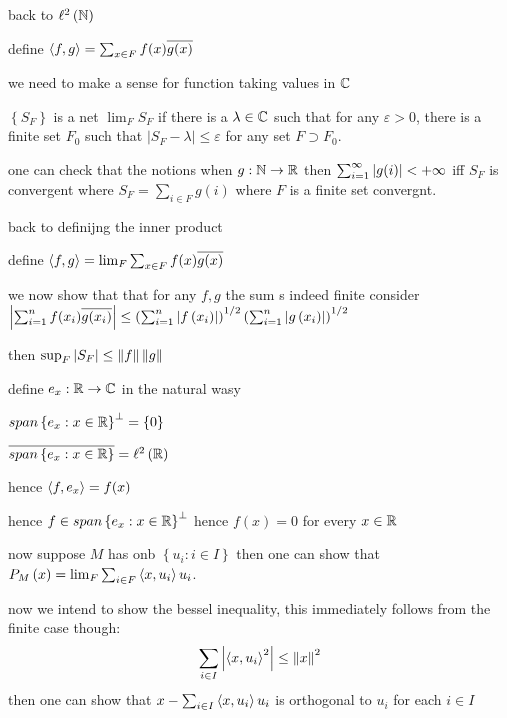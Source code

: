  back to $\ell ^{2 } \left( \mathbb N \right)$

 define $\left\langle f,g \right\rangle = \sum_{x\in F} f(x) \overline{g(x)}$

 we need to make a sense for function taking values in $\mathbb C$

 \begin{definition}
 $\left\{ S_{F} \right\}$ is a net $\lim_{F} S_{F}$ if there is a $\lambda \in \mathbb C$ such that for any $\varepsilon > 0$, there is a finite set $F_{0}$ such that $|S_{F} - \lambda | \le \varepsilon$ for any set $F \supset F_{0}$.

 \end{definition}
 

 one can check that the notions when $g : \mathbb N \to \mathbb R$ then $\sum_{i=1}^{\infty} \left\lvert g(i) \right\rvert < +\infty$ iff $S_{F}$ is convergent where $S_{F}= \sum_{i\in F} g(i)$ where $F$ is a finite set convergnt.

back to definijng the inner product


define $\left\langle f,g \right\rangle = \lim_{F} \sum_{x\in F} f(x) \overline{g(x)}$


we now show that that for any $f,g$ the sum s indeed finite
consider
$\left\lvert \sum_{i=1}^{n} f(x_{i})\overline{g(x_i)} \right\rvert \le \left( \sum_{i=1}^{n} \left\lvert f\left( x_{i} \right) \right\rvert \right) ^{1/2} \left( \sum_{i=1}^{n} \left\lvert g\left( x_{i} \right) \right\rvert \right) ^{1/2} $

then $\sup_{F} \left\lvert S_{F} \right\rvert \le \left\lVert f \right\rVert \left\lVert g \right\rVert$

define $e_{x} : \mathbb R \to \mathbb C$ in the natural wasy


$span \left\{ e_{x} : x\in \mathbb R \right\} ^{\perp} = \left\{ 0 \right\}$

$\overline{span \left\{ e_{x} : x\in \mathbb R \right\}} = \ell ^{2} \left( \mathbb R \right)$

hence $\left\langle f, e_{x} \right\rangle = f(x)$

hence $f \in span \left\{ e_{x} : x \in \mathbb R \right\}^{\perp}$ hence $f(x)=0$ for every $x\in \mathbb R$

now suppose $M$ has onb $\left\{ u_{i} :  i\in I \right\}$ then one can show that $P_{M} \left( x \right) = \lim _{F} \sum_{i \in F} \left\langle x,u_{i} \right\rangle u_{i}$.


now we intend to show the bessel inequality, this immediately follows from the finite case though:
\begin{align*}
    \sum_{i\in I} \left\lvert \left\langle x, u_{i} \right\rangle^{2}  \right\rvert \le \left\lVert x \right\rVert^{2}
\end{align*}
then one can show that $x-\sum_{i\in I} \left\langle x, u_{i} \right\rangle u_{i}$ is orthogonal to $u_{i}$ for each $i\in I$

